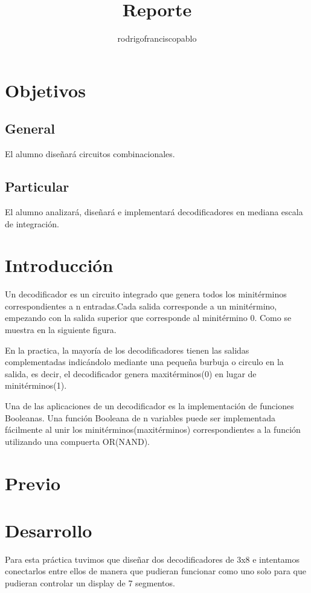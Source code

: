 \documentclass{mylib/reporteConCalif}
\title{Reporte}
\author{rodrigofranciscopablo }
\begin{document}
\coverPage

\section{Objetivos}

\subsection{General}

El alumno diseñará circuitos combinacionales.

\subsection{Particular}

El alumno analizará, diseñará e implementará decodificadores en mediana escala de integración.
\section{Introducción}

Un decodificador es un circuito integrado que genera todos los minitérminos correspondientes a n entradas.Cada salida corresponde a un minitérmino, empezando con la salida superior que corresponde al minitérmino 0. Como se muestra en la siguiente figura.


En la practica, la mayoría de los decodificadores tienen las salidas complementadas indicándolo mediante una pequeña burbuja o circulo en la salida, es decir, el decodificador genera maxitérminos(0) en lugar de minitérminos(1).

Una de las aplicaciones de un decodificador es la implementación de funciones Booleanas. Una función Booleana de n variables puede ser implementada fácilmente al unir los minitérminos(maxitérminos) correspondientes a la función utilizando una compuerta OR(NAND).


\newpage
\section{Previo}

\newpage
\section{Desarrollo}

Para esta práctica tuvimos que diseñar dos decodificadores de 3x8 e intentamos conectarlos entre ellos de manera que pudieran funcionar como uno solo para que pudieran controlar un display de 7 segmentos.
\end{document}

